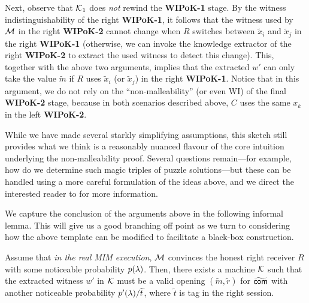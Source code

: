 Next, observe that $\mathcal{K}_1$ does {\em not} rewind the {\bf WIPoK-1} stage. By the witness indistinguishability of the right {\bf WIPoK-1}, it follows that the witness used by $\mathcal{M}$ in the right {\bf WIPoK-2} cannot change when $R$ switches between $\tilde{x}_i$ and $\tilde{x}_j$ in the right {\bf WIPoK-1} (otherwise, we can invoke the knowledge extractor of the right {\bf WIPoK-2} to extract the used witness to detect this change). This, together with the above two arguments, implies that the extracted $w'$ can only take the value $\tilde{m}$ if $R$ uses $\tilde{x}_i$ (or $\tilde{x}_j$) in the right {\bf WIPoK-1}. Notice that in this argument, we do not rely on the ``non-malleability'' (or even WI) of the final {\bf WIPoK-2} stage, because in both scenarios described above, $C$ uses the same $x_k$ in the left {\bf WIPoK-2}. 

While we have made several starkly simplifying assumptions, this sketch still provides what we think is a reasonably nuanced flavour of the core intuition underlying the non-malleability proof. Several questions remain---for example, how do we determine such magic triples of puzzle solutions---but these can be handled using a more careful formulation of the ideas above, and we direct the interested reader to  \cite{FOCS:LPY23} for more information. 

We capture the conclusion of the arguments above in the following informal lemma. This will give us a good branching off point as we turn to considering how the above template can be modified to facilitate a black-box construction. 

\begin{lemma}[Informal]\label{lem:tech-overview:main}
    Assume that {\em in the real MIM execution}, $\mathcal{M}$ convinces the honest right receiver $R$ with some noticeable probability $p(\lambda)$. Then, there exists a machine $\mathcal{K}$ such that the extracted witness $w'$ in $\mathcal{K}$ must be a valid opening $(\tilde{m},\tilde{r})$ for $\widetilde{\mathsf{com}}$ with another noticeable probability $p'(\lambda)/\widetilde{t}$, where $\tilde{t}$ is tag in the right session. 
\end{lemma}

